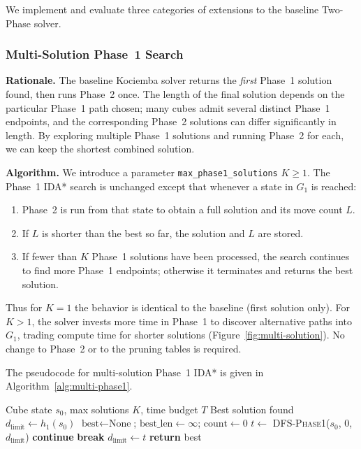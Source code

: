 \documentclass[conference]{IEEEtran}
\begin{document}
We implement and evaluate three categories of extensions to the baseline Two-Phase solver.

\subsubsection{Multi-Solution Phase~1 Search}
\label{sec:multi-phase1}

\textbf{Rationale.} The baseline Kociemba solver returns the \emph{first} Phase~1 solution found, then runs Phase~2 once. The length of the final solution depends on the particular Phase~1 path chosen; many cubes admit several distinct Phase~1 endpoints, and the corresponding Phase~2 solutions can differ significantly in length. By exploring multiple Phase~1 solutions and running Phase~2 for each, we can keep the shortest combined solution.

\textbf{Algorithm.} We introduce a parameter \texttt{max\_phase1\_solutions} $K \geq 1$. The Phase~1 IDA* search is unchanged except that whenever a state in $G_1$ is reached:
\begin{enumerate}
  \item Phase~2 is run from that state to obtain a full solution and its move count $L$.
  \item If $L$ is shorter than the best so far, the solution and $L$ are stored.
  \item If fewer than $K$ Phase~1 solutions have been processed, the search continues to find more Phase~1 endpoints; otherwise it terminates and returns the best solution.
\end{enumerate}
Thus for $K=1$ the behavior is identical to the baseline (first solution only). For $K>1$, the solver invests more time in Phase~1 to discover alternative paths into $G_1$, trading compute time for shorter solutions (Figure~\ref{fig:multi-solution}). No change to Phase~2 or to the pruning tables is required.

The pseudocode for multi-solution Phase~1 IDA* is given in Algorithm~\ref{alg:multi-phase1}.

\begin{algorithm}[t]
\caption{Multi-Solution Phase~1 IDA*}
\label{alg:multi-phase1}
\begin{algorithmic}[1]
\REQUIRE Cube state $s_0$, max solutions $K$, time budget $T$
\ENSURE Best solution found
\STATE $d_{\text{limit}} \gets h_1(s_0)$
\STATE $\text{best} \gets \text{None}$; $\text{best\_len} \gets \infty$; $\text{count} \gets 0$
  \STATE $t \gets$ \textsc{DFS-Phase1}($s_0$, $0$, $d_{\text{limit}}$)
    \STATE \textbf{continue} 
  \ENDIF
    \STATE \textbf{break} 
  \ENDIF
  \STATE $d_{\text{limit}} \gets t$ 
\ENDWHILE
\STATE \textbf{return} best
\end{algorithmic}
\end{algorithm}
\end{document}
